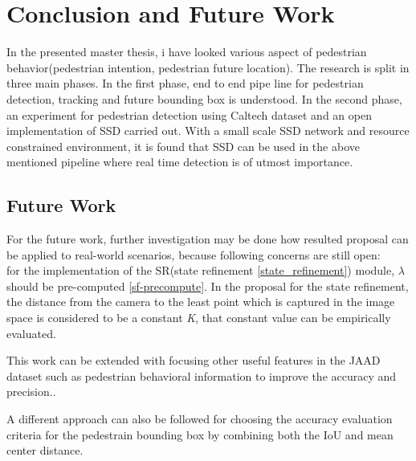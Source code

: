 
\chapter{Conclusion and Future Work}
In the presented master thesis, i have looked various aspect of pedestrian behavior(pedestrian intention, pedestrian future location). The research is split in three main phases. In the first phase, end to end pipe line for pedestrian detection, tracking and future bounding box is understood. In the second phase, an experiment for pedestrian detection using Caltech dataset and an open implementation of SSD carried out. With a small scale SSD network and resource constrained environment, it is found that SSD can be used in the above mentioned pipeline where real time detection is of utmost importance.


\section{Future Work}
For the future work, further investigation may be done how resulted proposal can be applied to real-world scenarios, because following concerns are still open: \\
for the implementation of the SR(state refinement \ref{state_refinement}) module, $\lambda$ should be pre-computed \ref{sf-precompute}. In the proposal for the state refinement, the distance from the camera to the least point which is captured in the image space is considered to be a constant \textit{K}, that constant value can be empirically evaluated.

This work can be extended with focusing other useful features in the JAAD dataset such as pedestrian behavioral information to improve the accuracy and precision..

A different approach can also be followed for choosing the accuracy evaluation criteria for the pedestrain bounding box by combining both the IoU and mean center distance.

